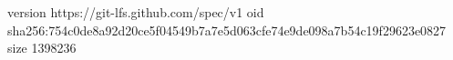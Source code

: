 version https://git-lfs.github.com/spec/v1
oid sha256:754c0de8a92d20ce5f04549b7a7e5d063cfe74e9de098a7b54c19f29623e0827
size 1398236
